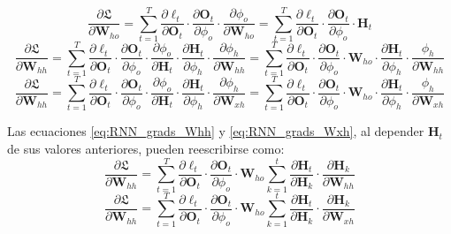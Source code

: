 \documentclass[a4paper,12pt]{article}
\begin{document}
\begin{equation}
    \frac{\partial\mathfrak{L}}{\partial\mathbf{W}_{ho}} = 
    \sum_{t=1}^{T}\frac{\partial\ell_{t}}{\partial\mathbf{O}_{t}}
    \cdot
    \frac{\partial\mathbf{O}_{t}}{\partial\phi_{o}}
    \cdot
    \frac{\partial\phi_{o}}{\partial\mathbf{W}_{ho}} = 
    \sum_{t=1}^{T}\frac{\partial\ell_{t}}{\partial\mathbf{O}_{t}}
    \cdot
    \frac{\partial\mathbf{O}_{t}}{\partial\phi_{o}}
    \cdot
    \mathbf{H}_{t}
    \label{eq:RNN_grads_Who}
\end{equation}
\begin{equation}
    \frac{\partial\mathfrak{L}}{\partial\mathbf{W}_{hh}} = 
    \sum_{t=1}^{T}\frac{\partial\ell_{t}}{\partial\mathbf{O}_{t}}
    \cdot
    \frac{\partial\mathbf{O}_{t}}{\partial\phi_{o}}
    \cdot
    \frac{\partial\phi_{o}}{\partial\mathbf{H}_{t}}
    \cdot
    \frac{\partial\mathbf{H}_{t}}{\partial\phi_{h}}
    \cdot
    \frac{\partial\phi_{h}}{\partial\mathbf{W}_{hh}} = 
    \sum_{t=1}^{T}\frac{\partial\ell_{t}}{\partial\mathbf{O}_{t}}
    \cdot
    \frac{\partial\mathbf{O}_{t}}{\partial\phi_{o}}
    \cdot
    \mathbf{W}_{ho}
    \cdot
    \frac{\partial\mathbf{H}_{t}}{\partial\phi_{h}}
    \cdot
    \frac{\phi_{h}}{\partial\mathbf{W}_{hh}}
    \label{eq:RNN_grads_Whh}
\end{equation}
\begin{equation}
    \frac{\partial\mathfrak{L}}{\partial\mathbf{W}_{hh}} = 
    \sum_{t=1}^{T}\frac{\partial\ell_{t}}{\partial\mathbf{O}_{t}}
    \cdot
    \frac{\partial\mathbf{O}_{t}}{\partial\phi_{o}}
    \cdot
    \frac{\partial\phi_{o}}{\partial\mathbf{H}_{t}}
    \cdot
    \frac{\partial\mathbf{H}_{t}}{\partial\phi_{h}}
    \cdot
    \frac{\partial\phi_{h}}{\partial\mathbf{W}_{xh}} = 
    \sum_{t=1}^{T}\frac{\partial\ell_{t}}{\partial\mathbf{O}_{t}}
    \cdot
    \frac{\partial\mathbf{O}_{t}}{\partial\phi_{o}}
    \cdot
    \mathbf{W}_{ho}
    \cdot
    \frac{\partial\mathbf{H}_{t}}{\partial\phi_{h}}
    \cdot
    \frac{\phi_{h}}{\partial\mathbf{W}_{xh}}
    \label{eq:RNN_grads_Wxh}
\end{equation}

Las ecuaciones \ref{eq:RNN_grads_Whh} y \ref{eq:RNN_grads_Wxh},
al depender $\mathbf{H}_{t}$ de sus valores anteriores, pueden
reescribirse como:
\begin{equation}
    \frac{\partial\mathfrak{L}}{\partial\mathbf{W}_{hh}} = 
    \sum_{t=1}^{T}\frac{\partial\ell_{t}}{\partial\mathbf{O}_{t}}
    \cdot
    \frac{\partial\mathbf{O}_{t}}{\partial\phi_{o}}
    \cdot
    \mathbf{W}_{ho}
    \sum_{k=1}^{t}
    \frac{\partial\mathbf{H}_{t}}{\partial\mathbf{H}_{k}}
    \cdot
    \frac{\partial\mathbf{H}_{k}}{\partial\mathbf{W}_{hh}}
    \label{eq:RNN_gradsTD_Whh}
\end{equation}
\begin{equation}
    \frac{\partial\mathfrak{L}}{\partial\mathbf{W}_{hh}} = 
    \sum_{t=1}^{T}\frac{\partial\ell_{t}}{\partial\mathbf{O}_{t}}
    \cdot
    \frac{\partial\mathbf{O}_{t}}{\partial\phi_{o}}
    \cdot
    \mathbf{W}_{ho}
    \sum_{k=1}^{t}
    \frac{\partial\mathbf{H}_{t}}{\partial\mathbf{H}_{k}}
    \cdot
    \frac{\partial\mathbf{H}_{k}}{\partial\mathbf{W}_{xh}}
    \label{eq:RNN_gradsTD_Wxh}
\end{equation}
\end{document}
